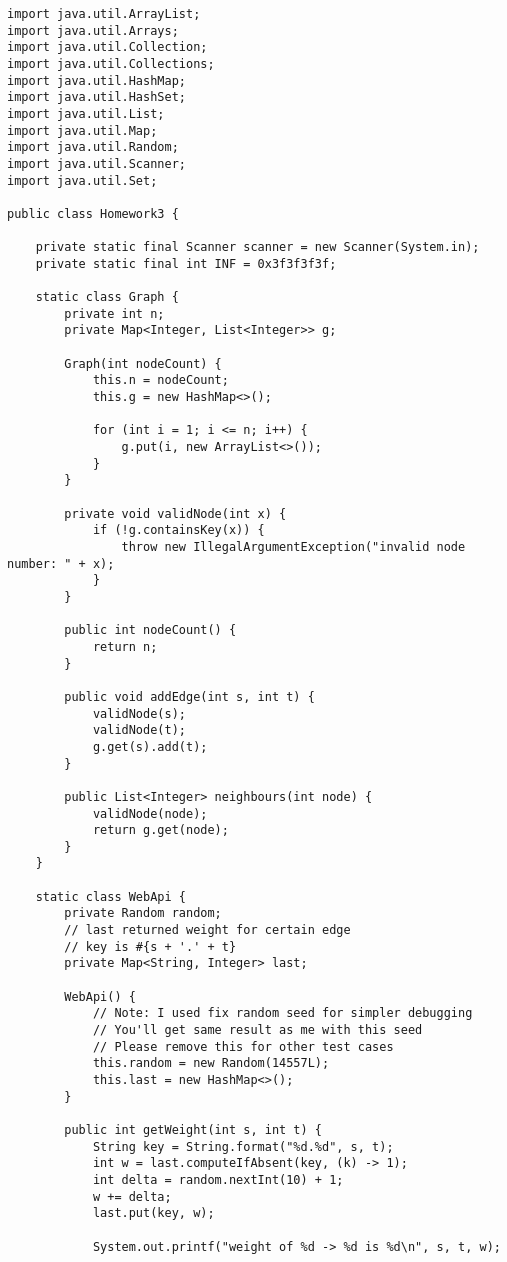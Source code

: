 \documentclass[14pt, a4paper]{article}
\begin{document}
\begin{verbatim}
import java.util.ArrayList;
import java.util.Arrays;
import java.util.Collection;
import java.util.Collections;
import java.util.HashMap;
import java.util.HashSet;
import java.util.List;
import java.util.Map;
import java.util.Random;
import java.util.Scanner;
import java.util.Set;

public class Homework3 {

    private static final Scanner scanner = new Scanner(System.in);
    private static final int INF = 0x3f3f3f3f;

    static class Graph {
        private int n;
        private Map<Integer, List<Integer>> g;

        Graph(int nodeCount) {
            this.n = nodeCount;
            this.g = new HashMap<>();

            for (int i = 1; i <= n; i++) {
                g.put(i, new ArrayList<>());
            }
        }

        private void validNode(int x) {
            if (!g.containsKey(x)) {
                throw new IllegalArgumentException("invalid node number: " + x);
            }
        }

        public int nodeCount() {
            return n;
        }

        public void addEdge(int s, int t) {
            validNode(s);
            validNode(t);
            g.get(s).add(t);
        }

        public List<Integer> neighbours(int node) {
            validNode(node);
            return g.get(node);
        }
    }

    static class WebApi {
        private Random random;
        // last returned weight for certain edge
        // key is #{s + '.' + t}
        private Map<String, Integer> last;

        WebApi() {
            // Note: I used fix random seed for simpler debugging
            // You'll get same result as me with this seed
            // Please remove this for other test cases
            this.random = new Random(14557L);
            this.last = new HashMap<>();
        }

        public int getWeight(int s, int t) {
            String key = String.format("%d.%d", s, t);
            int w = last.computeIfAbsent(key, (k) -> 1);
            int delta = random.nextInt(10) + 1;
            w += delta;
            last.put(key, w);

            System.out.printf("weight of %d -> %d is %d\n", s, t, w);


\end{verbatim}
\end{document}
